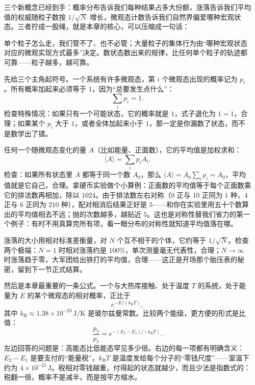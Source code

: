 
三个新概念已经到手：概率分布告诉我们每种结果占多大份额，涨落告诉我们平均值的权威随粒子数按 \(1/\sqrt{N}\) 增长，微观态计数告诉我们自然界偏爱哪种宏观状态。三者拧成一股绳，就是本章的核心，可以压缩成一句话：

\begin{oneline}
单个粒子怎么走，我们管不了、也不必管；大量粒子的集体行为由“哪种宏观状态对应的微观实现方式最多”决定。数状态数出来的规律，比任何单个粒子的轨迹都可靠——粒子越多，越可靠。
\end{oneline}


先给三个主角起符号。一个系统有许多微观态，第 \(i\) 个微观态出现的概率记为 \(p_i\)。所有概率加起来必须等于 \(1\)，因为“总要发生点什么”：
\[
\sum_i p_i = 1 .
\]
检查特殊情况：如果只有一个可能状态，它的概率就是 \(1\)，式子退化为 \(1=1\)，合理；如果某个 \(p_i\) 大于 \(1\)，或者全体加起来小于 \(1\)，那一定是你漏数了状态，而不是数学出了错。

任何一个随微观态变化的量 \(A\)（比如能量、正面数），它的平均值是加权求和：
\[
\langle A \rangle = \sum_i p_i A_i .
\]
检查：如果所有状态里 \(A\) 都等于同一个数 \(A_0\)，那么 \(\langle A\rangle = A_0\sum_i p_i = A_0\)，平均值就是它自己，合理。拿硬币实验做个小算例：正面数的平均值等于每个正面数乘它的排法数再相加，除以 \(1024\)。由于排法数左右对称（\(0\) 正与 \(10\) 正同为 \(1\) 种，\(4\) 正与 \(6\) 正同为 \(210\) 种），配对相消后结果正好是 \(5\)——和你在实验里用五十个数算出的平均值相去不远；抛的次数越多，越贴近 \(5\)。这也是对称性替我们省力的第一个例子：有时不用真算完所有项，看一眼分布的对称性就知道平均值落在哪。

涨落的大小用相对标准差衡量，对 \(N\) 个互不相干的个体，它约等于 \(1/\sqrt{N}\)。检查两个极端：\(N=1\) 时相对涨落约是 \(100\%\)，单次测量毫无代表性，合理；\(N\to\infty\) 时涨落趋于零，大军团给出铁打的平均值，合理——这正是开场那个胎压表的秘密，留到下一节正式结算。

然后是本章最重要的一条公式。一个与大热库接触、处于温度 \(T\) 的系统，处于能量为 \(E\) 的某个微观态的相对概率，正比于
\[
e^{-E/(k_{\mathrm B} T)},
\]
其中 \(k_{\mathrm B}\approx 1.38\times10^{-23}\,\mathrm{J/K}\) 是玻尔兹曼常数。比较两个能级，更方便的形式是比值：
\[
\frac{p_2}{p_1} = e^{-(E_2-E_1)/(k_{\mathrm B} T)} .
\]
左边回答的问题是：高能态比低能态罕见多少倍。右边的每一项都有明确含义：\(E_2-E_1\) 是要支付的“能量税”，\(k_{\mathrm B}T\) 是温度发给每个分子的“零钱尺度”——室温下约为 \(4\times10^{-21}\,\mathrm{J}\)。税相对零钱越重，付得起的状态就越少，而且少法是指数式的：税翻一倍，概率不是减半，而是按平方缩水。

